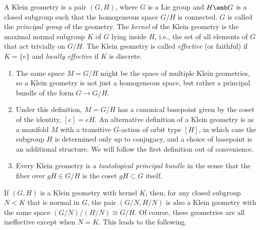 \begin{defn}
    A Klein geometry is a pair $(G,H)$, where $G$ is a Lie group and $H\emb G$ is a closed subgroup such that the homogeneous space $G\slash H$ is connected. $G$ is called the \emph{principal group} of the geometry. The \emph{kernel} of the Klein geometry is the maximal normal subgroup $K$ of $G$ lying inside $H$, i.e., the set of all elements of $G$ that act trivially on $G\slash H$. The Klein geometry is called \emph{effective} (or faithful) if $K=\{e\}$ and \emph{locally effective} if $K$ is discrete. 
\end{defn}

\begin{rem}
    \begin{enumerate}
        \item The same space $M=G\slash H$ might be the space of multiple Klein geometries, so a Klein geometry is not  just a homogeneous space, but rather a principal bundle of the form $G\to G\slash H$. 
        \item Under this definition, $M=G\slash H$ has a canonical basepoint given by the coset of the identity, $[e]=eH$. An alternative definition of a Klein geometry is as a manifold $M$ with a transitive $G$-action of orbit type $[H]$, in which case the subgroup $H$ is determined only up to conjugacy, and a choice of basepoint is an additional structure. We will follow the first definition out of convenience.
        \item Every Klein geometry is a \emph{tautological principal bundle} in the sense that the fiber over $gH\in G\slash H$ is the coset $gH\subset G$ itself. 
    \end{enumerate}
\end{rem}



If $(G,H)$ is a Klein geometry with kernel $K$, then, for any closed subgroup $N<K$ that is normal in $G$, the pair $(G\slash N,H\slash N)$ is also a Klein geometry with the same space $(G\slash N)\slash(H\slash N)\cong G\slash H$. Of course, these geometries are all ineffective except when $N=K$. This leads to the following.

